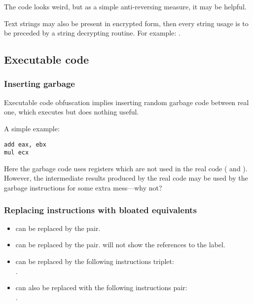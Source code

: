 The code looks weird, but as a simple anti-reversing measure, it may be helpful.

Text strings may also be present in encrypted form, 
then every string usage is to be preceded by a string decrypting routine.
For example: .

\subsection{Executable code}

\subsubsection{Inserting garbage}

Executable code obfuscation implies inserting random garbage code between real one,
which executes but does nothing useful.

A simple example:

\begin{lstlisting}[caption=original code,style=customasm]
add	eax, ebx
mul	ecx
\end{lstlisting}



Here the garbage code uses registers which are not used in the real code ( and ).
However, the intermediate results produced by the real code 
may be used by the garbage instructions for some extra mess---why not?

\subsubsection{Replacing instructions with bloated equivalents}

\begin{itemize}
\item {} can be replaced by the  pair.
\item {} can be replaced by the  pair. 
\IDA{} will not show the references to the label.
\item {} can be replaced by the following instructions triplet:\\
.
\item {} can also be replaced with the following instructions pair: \\
.%

\end{itemize}

